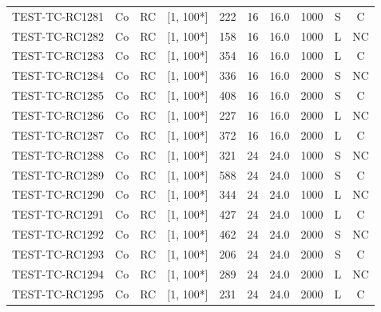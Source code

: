\begin{longtable}{lccccccccc}
TEST-TC-RC1281 & Co & RC & [1, 100*] & 222 & 16 & 16.0 & 1000 & S & C \\
TEST-TC-RC1282 & Co & RC & [1, 100*] & 158 & 16 & 16.0 & 1000 & L & NC \\
TEST-TC-RC1283 & Co & RC & [1, 100*] & 354 & 16 & 16.0 & 1000 & L & C \\
TEST-TC-RC1284 & Co & RC & [1, 100*] & 336 & 16 & 16.0 & 2000 & S & NC \\
TEST-TC-RC1285 & Co & RC & [1, 100*] & 408 & 16 & 16.0 & 2000 & S & C \\
TEST-TC-RC1286 & Co & RC & [1, 100*] & 227 & 16 & 16.0 & 2000 & L & NC \\
TEST-TC-RC1287 & Co & RC & [1, 100*] & 372 & 16 & 16.0 & 2000 & L & C \\
TEST-TC-RC1288 & Co & RC & [1, 100*] & 321 & 24 & 24.0 & 1000 & S & NC \\
TEST-TC-RC1289 & Co & RC & [1, 100*] & 588 & 24 & 24.0 & 1000 & S & C \\
TEST-TC-RC1290 & Co & RC & [1, 100*] & 344 & 24 & 24.0 & 1000 & L & NC \\
TEST-TC-RC1291 & Co & RC & [1, 100*] & 427 & 24 & 24.0 & 1000 & L & C \\
TEST-TC-RC1292 & Co & RC & [1, 100*] & 462 & 24 & 24.0 & 2000 & S & NC \\
TEST-TC-RC1293 & Co & RC & [1, 100*] & 206 & 24 & 24.0 & 2000 & S & C \\
TEST-TC-RC1294 & Co & RC & [1, 100*] & 289 & 24 & 24.0 & 2000 & L & NC \\
TEST-TC-RC1295 & Co & RC & [1, 100*] & 231 & 24 & 24.0 & 2000 & L & C \\
\bottomrule
\end{longtable}